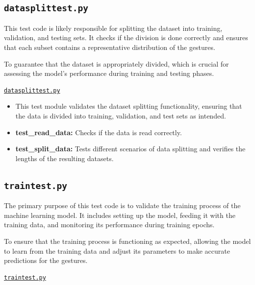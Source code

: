 			\subsection{\texttt{datasplittest.py}}
			
			This test code is likely responsible for splitting the dataset into training, validation, and testing sets. It checks if the division is done correctly and ensures that each subset contains a representative distribution of the gestures.
			
			To guarantee that the dataset is appropriately divided, which is crucial for assessing the model's performance during training and testing phases.
			
			\href{../Documents/MagicWand/ML23-06-Magic-Wand-with-an-Arduino-Nano-33-BLE-sense/Sourcecode/Code/Datatraining/Tests/datasplittest.py}{\texttt{datasplittest.py}}
			
			\begin{itemize}
				
				\item This test module validates the dataset splitting functionality, ensuring that the data is divided into training, validation, and test sets as intended.
				
				\item \textbf{test\_read\_data:} Checks if the data is read correctly.
				
				\item \textbf{test\_split\_data:} Tests different scenarios of data splitting and verifies the lengths of the resulting datasets.
				
			\end{itemize}
			
			\subsection{\texttt{traintest.py}}
			
			The primary purpose of this test code is to validate the training process of the machine learning model. It includes setting up the model, feeding it with the training data, and monitoring its performance during training epochs.
			
			To ensure that the training process is functioning as expected, allowing the model to learn from the training data and adjust its parameters to make accurate predictions for the gestures.
			
			\href{../Documents/MagicWand/ML23-06-Magic-Wand-with-an-Arduino-Nano-33-BLE-sense/Sourcecode/Code/Datatraining/Tests/traintest.py}{\texttt{traintest.py}}
			
